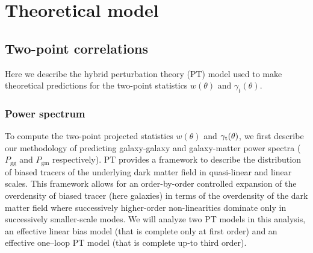 \documentclass[aps, prd,twocolumn,superscriptaddress,nofootinbib,preprintnumbers]{revtex4-1}
\newcommand{\gammat}{\ensuremath{\gamma_{\rm t}(\theta)}}
\newcommand{\wtheta}{\ensuremath{w(\theta)}}
\newcommand{\pgg}{\ensuremath{P_{\mathrm{gg}}}}
\newcommand{\pgm}{\ensuremath{P_{\mathrm{gm}}}}
\newcommand{\SP}[1]{{\color{orange}[SP: #1]}}
\newcommand{\jdr}[1]{{\color{blue}[JDR: #1]}}
\newcommand{\gary}[1]{\textcolor{red}{#1}}
\begin{document}
\section{Theoretical model}
\label{sec:stat_theory}
\subsection{Two-point correlations}


Here we describe the hybrid perturbation theory (PT) model used to make theoretical predictions for the two-point statistics $w(\theta)$ and $\gamma_t(\theta)$.

\subsubsection{Power spectrum}
\label{sec:Pk_pred}

To compute the two-point projected statistics $\wtheta$ and $\gammat$, we first describe our methodology of predicting galaxy-galaxy and galaxy-matter power spectra ($\pgg$ and $\pgm$ respectively). PT provides a framework to describe the distribution of biased tracers of the underlying dark matter field in quasi-linear and linear scales. This framework allows for an order-by-order controlled expansion of the overdensity of biased tracer (here galaxies) in terms of the overdensity of the dark matter field where successively higher-order non-linearities dominate only in successively smaller-scale modes. We will analyze two PT models in this analysis, an effective linear bias model (that is complete only at first order) and an effective one--loop PT model (that is complete up-to third order). 
\end{document}
